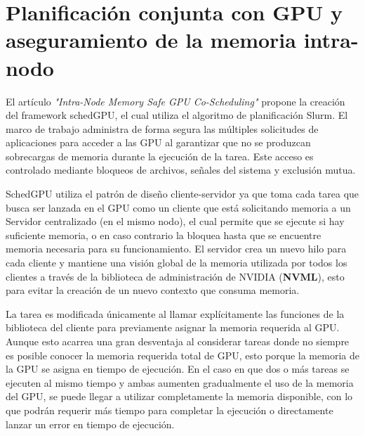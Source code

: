 \section{Planificación conjunta con GPU y aseguramiento de la memoria intra-nodo}

El artículo \textit{"Intra-Node Memory Safe GPU Co-Scheduling"}\cite{IntraNode} propone la creación del framework schedGPU, el cual utiliza el algoritmo de planificación Slurm. El marco de trabajo administra de forma segura las múltiples solicitudes de aplicaciones para acceder a las GPU al garantizar que no se produzcan sobrecargas de memoria durante la ejecución de la tarea. Este acceso es controlado mediante bloqueos de archivos, señales del sistema y exclusión mutua.

SchedGPU utiliza el patrón de diseño cliente-servidor ya que toma cada tarea que busca ser lanzada en el GPU como un cliente que está solicitando memoria a un Servidor centralizado (en el mismo nodo), el cual permite que se ejecute si hay suficiente memoria, o en caso contrario la bloquea hasta que se encuentre memoria necesaria para su funcionamiento. El servidor crea un nuevo hilo para cada cliente y mantiene una visión global de la memoria utilizada por todos los clientes a través de la biblioteca de administración de NVIDIA (\textbf{NVML}), esto para evitar la creación de un nuevo contexto que consuma memoria.

\vspace{0.3cm}

La tarea es modificada únicamente al llamar explícitamente las funciones de la biblioteca del cliente para previamente asignar la memoria requerida al GPU. Aunque esto acarrea una gran desventaja al considerar tareas donde no siempre es posible conocer la memoria requerida total de GPU, esto porque la memoria de la GPU se asigna en tiempo de ejecución. En el caso en que dos o más tareas se ejecuten al mismo tiempo y ambas aumenten gradualmente el uso de la memoria del GPU, se puede llegar a utilizar completamente la memoria disponible, con lo que podrán requerir más tiempo para completar la ejecución o directamente lanzar un error en tiempo de ejecución.



